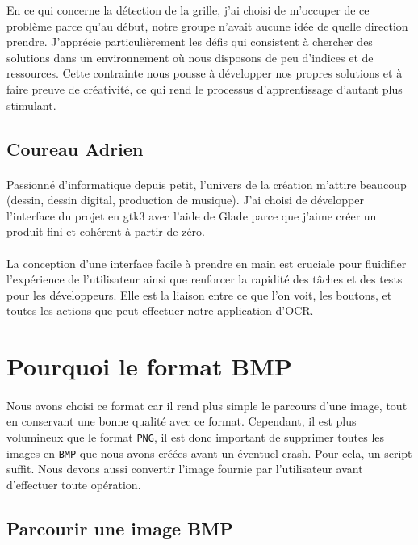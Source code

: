 \documentclass{article}
\begin{document}
En ce qui concerne la détection de la grille, j'ai choisi de m'occuper de ce problème parce qu'au début, notre groupe n'avait aucune idée de quelle direction prendre. J'apprécie particulièrement les défis qui consistent à chercher des solutions dans un environnement où nous disposons de peu d'indices et de ressources. Cette contrainte nous pousse à développer nos propres solutions et à faire preuve de créativité, ce qui rend le processus d'apprentissage d'autant plus stimulant.

\subsection{Coureau Adrien}
\paragraph{}
Passionné d'informatique depuis petit, l'univers de la création m'attire beaucoup (dessin, dessin digital, production de musique). J'ai choisi de développer l'interface du projet en gtk3 avec l'aide de Glade parce que j'aime créer un produit fini et cohérent à partir de zéro.
\paragraph{}
La conception d'une interface facile à prendre en main est cruciale pour fluidifier l'expérience de l'utilisateur ainsi que renforcer la rapidité des tâches et des tests pour les développeurs. Elle est la liaison entre ce que l'on voit, les boutons, et toutes les actions que peut effectuer notre application d'OCR.
\newpage
\section{Pourquoi le format BMP}
\paragraph{}
Nous avons choisi ce format car il rend plus simple le parcours d’une image, tout en conservant une bonne qualité avec ce format. Cependant, il est plus volumineux que le format \texttt{PNG}, il est donc important de supprimer toutes les images en \texttt{BMP} que nous avons créées avant un éventuel crash. Pour cela, un script suffit. Nous devons aussi convertir l’image fournie par l’utilisateur avant d’effectuer toute opération.

\subsection{Parcourir une image BMP}
\end{document}
